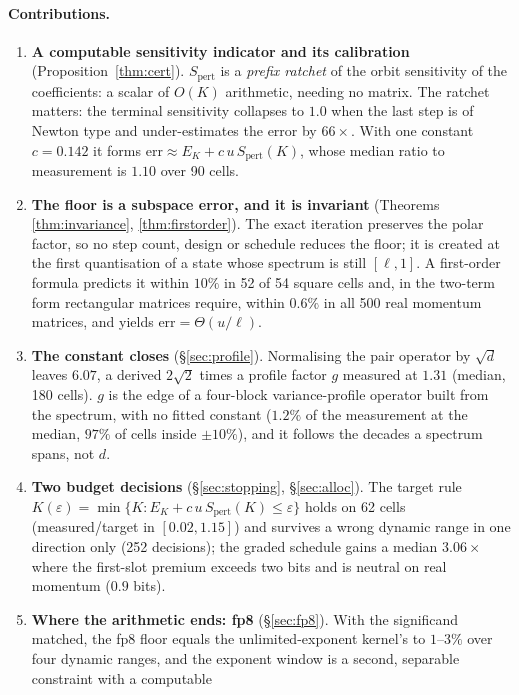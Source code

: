 \paragraph{Contributions.}
\begin{enumerate}
\item \textbf{A computable sensitivity indicator and its calibration}
(Proposition~\ref{thm:cert}).  $S_{\mathrm{pert}}$ is a \emph{prefix ratchet} of the
orbit sensitivity of the coefficients: a scalar of $O(K)$ arithmetic, needing no
matrix.  The ratchet matters: the terminal sensitivity collapses to $1.0$ when the last
step is of Newton type and under-estimates the error by $66\times$.  With one constant
$c=0.142$ it forms $\mathrm{err} \approx E_K + c\,u\,S_{\mathrm{pert}}(K)$, whose median
ratio to measurement is $1.10$ over 90 cells.
\item \textbf{The floor is a subspace error, and it is invariant} (Theorems
\ref{thm:invariance}, \ref{thm:firstorder}).  The exact iteration preserves the polar
factor, so no step count, design or schedule reduces the floor; it is created at the first
quantisation of a state whose spectrum is still $[\ell,1]$.  A
first-order formula predicts it within $10\%$ in 52 of 54 square cells and, in the
two-term form rectangular matrices require, within $0.6\%$ in all 500 real momentum
matrices, and yields $\mathrm{err}=\Theta(u/\ell)$.
\item \textbf{The constant closes} (\S\ref{sec:profile}).  Normalising the pair operator
by $\sqrt d$ leaves $6.07$, a derived $2\sqrt2$ times a profile factor $g$ measured at
$1.31$ (median, 180 cells).  $g$ is the edge of a four-block
variance-profile operator built from the spectrum, with no fitted constant ($1.2\%$ of the
measurement at the median, $97\%$ of cells inside $\pm10\%$), and it follows the decades a
spectrum spans, not $d$.
\item \textbf{Two budget decisions} (\S\ref{sec:stopping}, \S\ref{sec:alloc}).  The
target rule $K(\varepsilon) = \min\{K : E_K + c\,u\,S_{\mathrm{pert}}(K) \le
\varepsilon\}$ holds on 62 cells (measured/target in $[0.02,1.15]$) and survives a
wrong dynamic range in one direction only (252 decisions); the graded schedule gains a
median $3.06\times$ where the first-slot premium exceeds two bits and is neutral on real
momentum ($0.9$ bits).
\item \textbf{Where the arithmetic ends: fp8} (\S\ref{sec:fp8}).  With the significand
matched, the fp8 floor equals the unlimited-exponent kernel's to $1$--$3\%$ over four
dynamic ranges, and the exponent window is a second, separable constraint with a computable

\end{enumerate}
